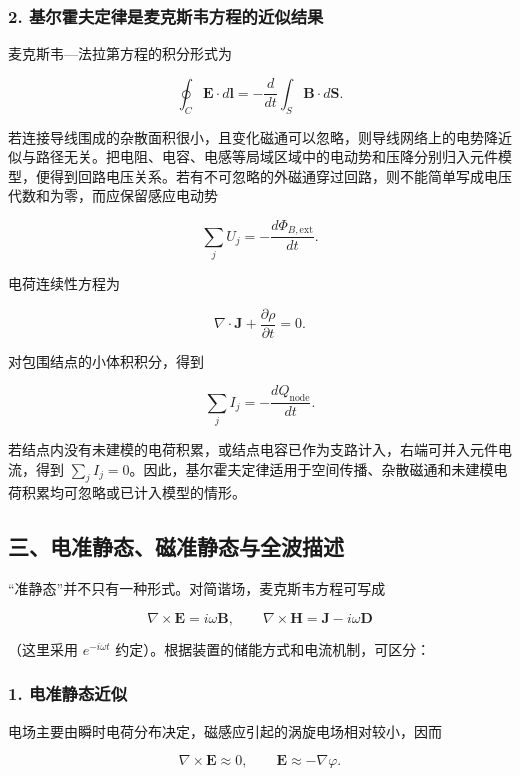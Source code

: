 \subsubsection{2.
基尔霍夫定律是麦克斯韦方程的近似结果}\label{m7:ux57faux5c14ux970dux592bux5b9aux5f8bux662fux9ea6ux514bux65afux97e6ux65b9ux7a0bux7684ux8fd1ux4f3cux7ed3ux679c}

麦克斯韦---法拉第方程的积分形式为

\[
\oint_C\mathbf E\cdot d\mathbf l
=-\frac{d}{dt}\int_S\mathbf B\cdot d\mathbf S.
\]

若连接导线围成的杂散面积很小，且变化磁通可以忽略，则导线网络上的电势降近似与路径无关。把电阻、电容、电感等局域区域中的电动势和压降分别归入元件模型，便得到回路电压关系。若有不可忽略的外磁通穿过回路，则不能简单写成电压代数和为零，而应保留感应电动势

\[
\sum_j U_j=-\frac{d\Phi_{B,\mathrm{ext}}}{dt}.
\]

电荷连续性方程为

\[
\nabla\cdot\mathbf J+\frac{\partial\rho}{\partial t}=0.
\]

对包围结点的小体积积分，得到

\[
\sum_j I_j=-\frac{dQ_{\mathrm{node}}}{dt}.
\]

若结点内没有未建模的电荷积累，或结点电容已作为支路计入，右端可并入元件电流，得到
\(\sum_j I_j=0\)。因此，基尔霍夫定律适用于空间传播、杂散磁通和未建模电荷积累均可忽略或已计入模型的情形。

\subsection{三、电准静态、磁准静态与全波描述}\label{m7:ux4e09ux7535ux51c6ux9759ux6001ux78c1ux51c6ux9759ux6001ux4e0eux5168ux6ce2ux63cfux8ff0}

``准静态''并不只有一种形式。对简谐场，麦克斯韦方程可写成

\[
\nabla\times\mathbf E=i\omega\mathbf B,
\qquad
\nabla\times\mathbf H=\mathbf J-i\omega\mathbf D
\]

（这里采用 \(e^{-i\omega t}\)
约定）。根据装置的储能方式和电流机制，可区分：

\subsubsection{1.
电准静态近似}\label{m7:ux7535ux51c6ux9759ux6001ux8fd1ux4f3c}

电场主要由瞬时电荷分布决定，磁感应引起的涡旋电场相对较小，因而

\[
\nabla\times\mathbf E\approx0,
\qquad \mathbf E\approx-\nabla\varphi.
\]

